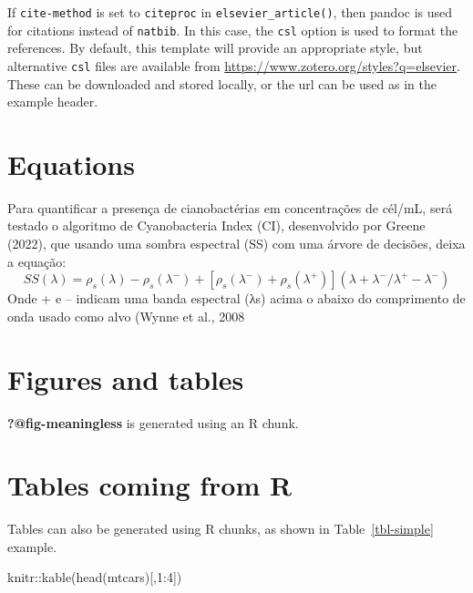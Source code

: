 \documentclass[
  super,
  preprint,
  3p]{elsarticle}
\newenvironment{Shaded}{\begin{snugshade}}{\end{snugshade}}
\newcommand{\DecValTok}[1]{\textcolor[rgb]{0.68,0.00,0.00}{#1}}
\newcommand{\FunctionTok}[1]{\textcolor[rgb]{0.28,0.35,0.67}{#1}}
\newcommand{\NormalTok}[1]{\textcolor[rgb]{0.00,0.23,0.31}{#1}}
\newcommand{\SpecialCharTok}[1]{\textcolor[rgb]{0.37,0.37,0.37}{#1}}
\begin{document}
If \texttt{cite-method} is set to \texttt{citeproc} in
\texttt{elsevier\_article()}, then pandoc is used for citations instead
of \texttt{natbib}. In this case, the \texttt{csl} option is used to
format the references. By default, this template will provide an
appropriate style, but alternative \texttt{csl} files are available from
\url{https://www.zotero.org/styles?q=elsevier}. These can be downloaded
and stored locally, or the url can be used as in the example header.

\hypertarget{equations}{%
\section{Equations}\label{equations}}

Para quantificar a presença de cianobactérias em concentrações de
cél/mL, será testado o algoritmo de Cyanobacteria Index (CI),
desenvolvido por Greene (2022), que usando uma sombra espectral (SS) com
uma árvore de decisões, deixa a equação: \[
SS(λ)= ρ_s (λ)-ρ_s (λ^- )+[ρ_s (λ^- )+ ρ_s (λ^+ )]  (λ+λ^-/λ^+ -λ^- )  
\] Onde + e -- indicam uma banda espectral (λs) acima o abaixo do
comprimento de onda usado como alvo (Wynne et al., 2008

\hypertarget{figures-and-tables}{%
\section{Figures and tables}\label{figures-and-tables}}

\textbf{?@fig-meaningless} is generated using an R chunk.

\hypertarget{tables-coming-from-r}{%
\section{Tables coming from R}\label{tables-coming-from-r}}

Tables can also be generated using R chunks, as shown in
Table~\ref{tbl-simple} example.

\begin{Shaded}
\begin{Highlighting}[]
\NormalTok{knitr}\SpecialCharTok{::}\FunctionTok{kable}\NormalTok{(}\FunctionTok{head}\NormalTok{(mtcars)[,}\DecValTok{1}\SpecialCharTok{:}\DecValTok{4}\NormalTok{])}
\end{Highlighting}
\end{Shaded}
\end{document}
